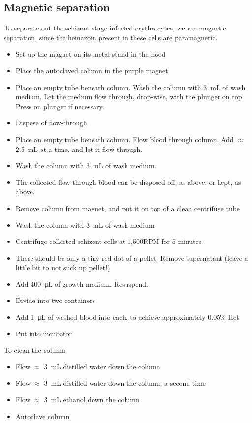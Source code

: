 \documentclass{article}
\begin{document}
\subsection{Magnetic separation}

To separate out the schizont-stage infected erythrocytes, we use magnetic separation, since the hemazoin present in these cells are paramagnetic.\\

\begin{itemize}
	\item Set up the magnet on its metal stand in the hood
	\item Place the autoclaved column in the purple magnet
	\item Place an empty tube beneath column. Wash the column with \SI{3}{mL} of wash medium. Let the medium flow through, drop-wise, with the plunger on top. Press on plunger if necessary.
	\item Dispose of flow-through
	\item Place an empty tube beneath column. Flow blood through column. Add $\approx$ \SI{2.5}{mL} at a time, and let it flow through.
	\item Wash the column with \SI{3}{mL} of wash medium.
	\item The collected flow-through blood can be disposed off, as above, or kept, as above.
	\item Remove column from magnet, and put it on top of a clean centrifuge tube
	\item Wash the column with \SI{3}{mL} of wash medium
	\item Centrifuge collected schizont cells at 1,500RPM for 5 minutes
	\item There should be only a tiny red dot of a pellet. Remove supernatant (leave a little bit to not suck up pellet!)
	\item Add \SI{400}{\micro\liter} of growth medium. Resuspend.
	\item Divide into two containers
	\item Add \SI{1}{\micro\liter} of washed blood into each, to achieve approximately 0.05\% Hct
	\item Put into incubator
\end{itemize}

To clean the column

\begin{itemize}
	\item Flow $\approx$ \SI{3}{mL} distilled water down the column
	\item Flow $\approx$ \SI{3}{mL} distilled water down the column, a second time
	\item Flow $\approx$ \SI{3}{mL} ethanol down the column
	\item Autoclave column
\end{itemize}
\end{document}
